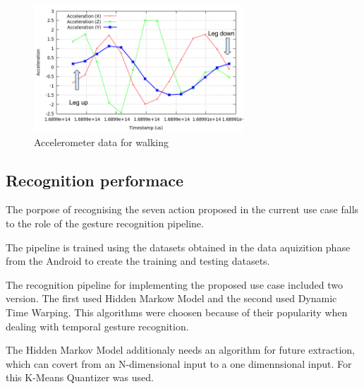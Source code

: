 \begin{figure}
    \centering
    \includegraphics[width=0.7\textwidth]{src/img/xyz-walking.png}
    \caption{Accelerometer data for walking}
    \label{fig:xyz-walking}
\end{figure}


\subsection{Recognition performace}
The porpose of recognising the seven action proposed in the current use case falls to the role of the gesture recognition pipeline.

The pipeline is trained using the datasets obtained in the data aquizition phase from the Android to create the training and testing datasets.

The recognition pipeline for implementing the proposed use case included two version. The first used Hidden Markow Model and the second used Dynamic Time Warping. This algorithms were choosen because of their popularity when dealing with temporal gesture recognition.

The Hidden Markov Model additionaly needs an algorithm for future extraction, which can covert from an N-dimensional input to a one dimennsional input. For this K-Means Quantizer was used.
